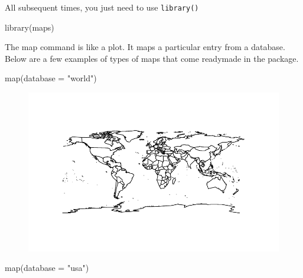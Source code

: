 \documentclass[
  letterpaper,
  DIV=11,
  numbers=noendperiod]{scrreprt}
\newenvironment{Shaded}{\begin{snugshade}}{\end{snugshade}}
\newcommand{\AttributeTok}[1]{\textcolor[rgb]{0.40,0.45,0.13}{#1}}
\newcommand{\FunctionTok}[1]{\textcolor[rgb]{0.28,0.35,0.67}{#1}}
\newcommand{\NormalTok}[1]{\textcolor[rgb]{0.00,0.23,0.31}{#1}}
\newcommand{\StringTok}[1]{\textcolor[rgb]{0.13,0.47,0.30}{#1}}
\begin{document}
All subsequent times, you just need to use \texttt{library()}

\begin{Shaded}
\begin{Highlighting}[]
\FunctionTok{library}\NormalTok{(maps)}
\end{Highlighting}
\end{Shaded}

The map command is like a plot. It maps a particular entry from a
database. Below are a few examples of types of maps that come readymade
in the package.

\begin{Shaded}
\begin{Highlighting}[]
\FunctionTok{map}\NormalTok{(}\AttributeTok{database =} \StringTok{"world"}\NormalTok{)}
\end{Highlighting}
\end{Shaded}

\begin{figure}[H]

{\centering \includegraphics{12-Maps_files/figure-pdf/unnamed-chunk-3-1.pdf}

}

\end{figure}

\begin{Shaded}
\begin{Highlighting}[]
\FunctionTok{map}\NormalTok{(}\AttributeTok{database =} \StringTok{"usa"}\NormalTok{)}
\end{Highlighting}
\end{Shaded}
\end{document}

